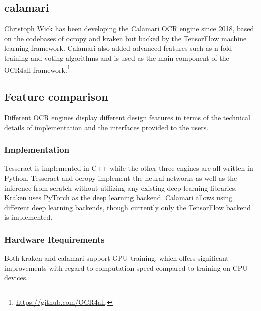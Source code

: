 \documentclass[conference]{IEEEtran}
\begin{document}
\subsection{calamari}

Christoph Wick has been developing the Calamari
\cite{DBLP:journals/corr/abs-1807-02004} OCR engine since 2018, based on the
codebases of ocropy and kraken but backed by the TensorFlow machine learning
framework. Calamari also added advanced features such as n-fold training and
voting algorithms and is used as the main component of the OCR4all
framework.\footnote{\url{https://github.com/OCR4all}.}

\subsection{Feature comparison}


Different OCR engines display different design features in terms of the
technical details of implementation and the interfaces provided to the users.

\subsubsection{Implementation}

Tesseract is implemented in C++ while the
other three engines are all written in Python. Tesseract and ocropy
implement the neural networks as well as the inference from scratch without
utilizing any existing deep learning libraries. Kraken uses PyTorch as the
deep learning backend. Calamari allows using different deep learning backends,
though currently only the TensorFlow backend is implemented.


\subsubsection{Hardware Requirements}

Both kraken and calamari support GPU training, which offers significant
improvements with regard to computation speed compared to training on CPU devices.

\end{document}
